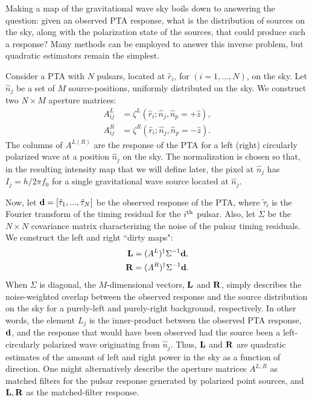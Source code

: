 \documentclass[%
 reprint,
nofootinbib,
 amsmath,amssymb,
 aps,
]{revtex4-2}
\begin{document}

Making a map of the gravitational wave sky boils down to answering the question: given an observed PTA response, what is the distribution of sources on the sky, along with the polarization state of the sources, that could produce such a response? Many methods can be employed to answer this inverse problem, but quadratic estimators remain the simplest. 

Consider a PTA with $N$ pulsars, located at $\hat{r}_i$, for $(i =1, ..., N)$, on the sky. Let $\hat{n}_j$ be a set of $M$ source-positions, uniformly distributed on the sky. We construct two $N \times M$ aperture matrices:
\begin{align}
    A^L_{ij} &= \zeta^L(\hat{r}_i;\hat{n}_j,\hat{n}_p=+\hat{z}), \\
    A^R_{ij} &= \zeta^R(\hat{r}_i;\hat{n}_j,\hat{n}_p=-\hat{z}).
\end{align}
The columns of $A^{L(R)}$ are the response of the PTA for a left (right) circularly polarized wave at a position $\hat{n}_j$ on the sky. The normalization is chosen so that, in the resulting intensity map that we will define later, the pixel at $\hat{n}_j$ has $I_j = h / 2 \pi f_0$ for a single gravitational wave source located at $\hat{n}_j $.  

Now, let ${\bf d} = [\tilde{\tau}_1,...,\tilde{\tau}_N]$ be the observed response of the PTA, where $\tilde{\tau}_i$ is the Fourier transform of the timing residual for the $i^{\rm th}$ pulsar. Also, let $\Sigma$ be the $N\times N$ covariance matrix characterizing the noise of the pulsar timing residuals. We construct the left and right ``dirty maps":
\begin{align}
    {\bf L} &= (A^L)^\dagger \Sigma^{-1}{\bf d},\\
    {\bf R} &= (A^R)^\dagger \Sigma^{-1} {\bf d}.
\end{align}
When $\Sigma$ is diagonal, the $M$-dimensional vectors, ${\bf L}$ and ${\bf R}$, simply describes the noise-weighted overlap between the observed response and the source distribution on the sky for a purely-left and purely-right background, respectively. In other words, the element $L_j$ is the inner-product between the observed PTA response, ${\bf d}$, and the response that would have been observed had the source been a left-circularly polarized wave originating from $\hat{n}_j$. Thus, ${\bf L}$ and ${\bf R}$ are quadratic estimates of the amount of left and right power in the sky as a function of direction. One might alternatively describe the aperture matrices $A^{L, R}$ as matched filters for the pulsar response generated by polarized point sources, and ${\bf L}, {\bf R}$ as the matched-filter response.
\end{document}
